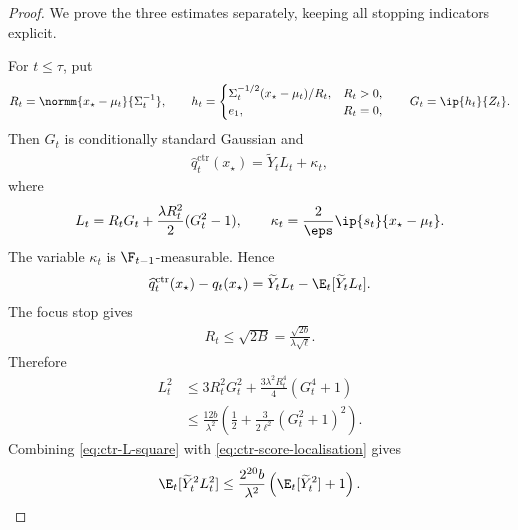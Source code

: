 \begin{proof}
    We prove the three estimates separately, keeping all stopping indicators
    explicit.

    For $t\leq\tau$, put
    \begin{align}
        R_t=\normm{x_\star-\mu_t}{\Sigma_t^{-1}},
        \qquad
        h_t=
        \begin{cases}
            \Sigma_t^{-1/2}(x_\star-\mu_t)/R_t, & R_t>0, \\
            e_1,                                & R_t=0,
        \end{cases}
        \qquad
        G_t=\ip{h_t}{Z_t}.
    \end{align}
    Then $G_t$ is conditionally standard Gaussian and
    \begin{align}
        \widehat q_t^{\mathrm{ctr}}(x_\star)
        =\widetilde Y_tL_t+\kappa_t,
        \label{eq:ctr-q-score-representation}
    \end{align}
    where
    \begin{align}
        L_t=R_tG_t+\frac{\lambda R_t^2}{2}(G_t^2-1),
        \qquad
        \kappa_t=\frac2\eps\ip{s_t}{x_\star-\mu_t}.
    \end{align}
    The variable $\kappa_t$ is $\F_{t-1}$-measurable.  Hence
    \begin{align}
        \widehat q_t^{\mathrm{ctr}}(x_\star)-q_t(x_\star)
        =\widetilde Y_tL_t-\E_t[\widetilde Y_tL_t].
        \label{eq:ctr-q-martingale-cancellation}
    \end{align}
    The focus stop gives
    \begin{align}
        R_t\leq\sqrt{2B}
        =\frac{\sqrt{2b}}{\lambda\sqrt\ell}.
        \label{eq:ctr-R-focus}
    \end{align}
    Therefore
    \begin{align}
        L_t^2
         & \leq3R_t^2G_t^2
        +\frac{3\lambda^2R_t^4}{4}(G_t^4+1)
        \\
         & \leq
        \frac{12b}{\lambda^2}
        \left(
        \frac12+\frac{3}{2\ell^2}(G_t^2+1)^2
        \right).
        \label{eq:ctr-L-square}
    \end{align}
    Combining \eqref{eq:ctr-L-square} with
    \eqref{eq:ctr-score-localisation} gives
    \begin{align}
        \E_t[\widetilde Y_t^2L_t^2]
        \leq\frac{2^{20}b}{\lambda^2}
        \left(\E_t[\widetilde Y_t^2]+1\right).
        \label{eq:ctr-q-predictable-second}
    \end{align}


\end{proof}
